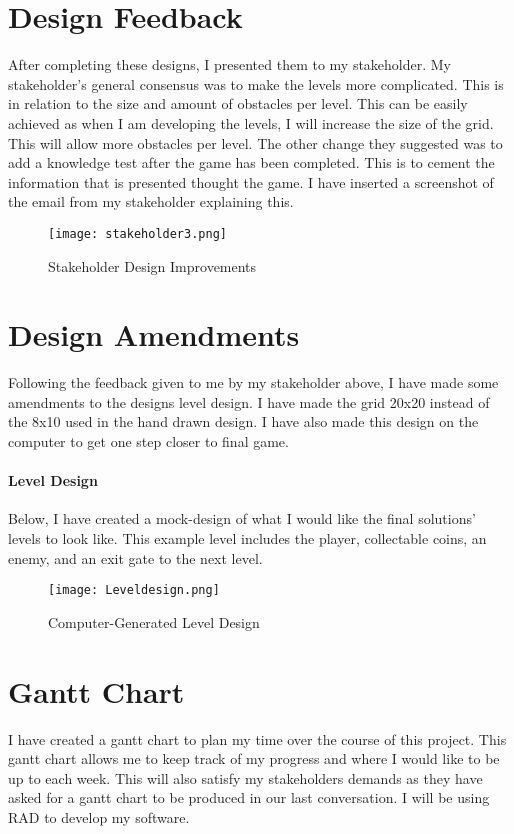 \documentclass[12pt]{report}
\begin{document}
\section{Design Feedback}
After completing these designs, I presented them to my stakeholder. My stakeholder's general consensus was to make the levels more complicated. This is in relation to the size and amount of obstacles per level. This can be easily achieved as when I am developing the levels, I will increase the size of the grid. This will allow more obstacles per level. The other change they suggested was to add a knowledge test after the game has been completed. This is to cement the information that is presented thought the game. I have inserted a screenshot of the email from my stakeholder explaining this. 

\begin{figure}[H]
    \centering
    \texttt{[image: stakeholder3.png]}
    \caption{Stakeholder Design Improvements}
    \label{stakeholder3}
\end{figure}

\clearpage

\section{Design Amendments}
Following the feedback given to me by my stakeholder above, I have made some amendments to the designs level design. I have made the grid 20x20 instead of the 8x10 used in the hand drawn design. I have also made this design on the computer to get one step closer to final game.

\paragraph{Level Design}
Below, I have created a mock-design of what I would like the final solutions' levels to look like. This example level includes the player, collectable coins, an enemy, and an exit gate to the next level. 

\begin{figure}[H]
    \centering
    \texttt{[image: Leveldesign.png]}
    \caption{Computer-Generated Level Design}
    \label{leveldesign}
\end{figure}

\clearpage

\section{Gantt Chart}
I have created a gantt chart to plan my time over the course of this project. This gantt chart allows me to keep track of my progress and where I would like to be up to each week. This will also satisfy my stakeholders demands as they have asked for a gantt chart to be produced in our last conversation. I will be using RAD to develop my software. 
\end{document}
